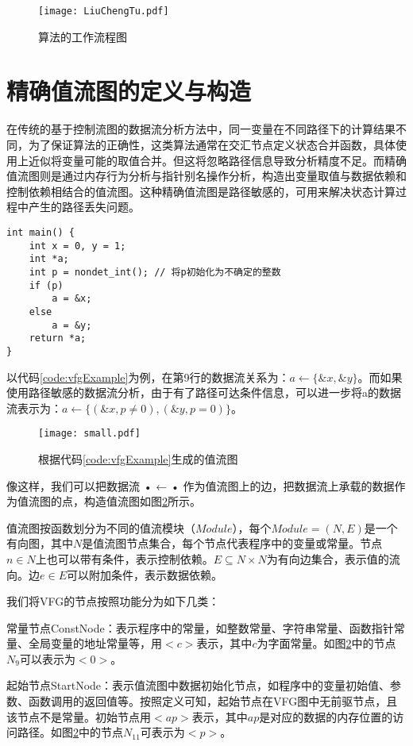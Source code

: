 \begin{figure}[H]
	\centering
	\texttt{[image: LiuChengTu.pdf]}
	\caption{算法的工作流程图}
	\label{fig:流程图}
\end{figure}

\section{精确值流图的定义与构造}

在传统的基于控制流图的数据流分析方法中，同一变量在不同路径下的计算结果不同，为了保证算法的正确性，这类算法通常在交汇节点定义状态合并函数，具体使用上近似将变量可能的取值合并。但这将忽略路径信息导致分析精度不足。而精确值流图则是通过内存行为分析与指针别名操作分析，构造出变量取值与数据依赖和控制依赖相结合的值流图。这种精确值流图是路径敏感的，可用来解决状态计算过程中产生的路径丢失问题。

\begin{lstlisting}[label=code:vfgExample,caption=代码样例]
int main() {
	int x = 0, y = 1;
	int *a;
	int p = nondet_int(); // 将p初始化为不确定的整数
	if (p)
		a = &x;
	else
		a = &y;
	return *a;
}
\end{lstlisting}

以代码\ref{code:vfgExample}为例，在第9行的数据流关系为：$ a \gets \{\&x, \&y\} $。而如果使用路径敏感的数据流分析，由于有了路径可达条件信息，可以进一步将a的数据流表示为：$ a \gets \{(\&x, p ≠ 0), (\&y, p = 0)\} $。

\begin{figure}[H]
	\centering
	\texttt{[image: small.pdf]}
	\caption{根据代码\ref{code:vfgExample}生成的值流图}
	\label{fig:small}
\end{figure}

像这样，我们可以把数据流 • ← • 作为值流图上的边，把数据流上承载的数据作为值流图的点，构造值流图如图\ref{fig:small}所示。

值流图按函数划分为不同的值流模块（$ Module $），每个$ Module = (N, E) $是一个有向图，其中$ N $是值流图节点集合，每个节点代表程序中的变量或常量。节点$ n ∈ N $上也可以带有条件，表示控制依赖。$ E ⊆ N × N $为有向边集合，表示值的流向。边$ e ∈ E $可以附加条件，表示数据依赖。

我们将VFG的节点按照功能分为如下几类：

常量节点ConstNode：表示程序中的常量，如整数常量、字符串常量、函数指针常量、全局变量的地址常量等，用$ <c> $表示，其中$ c $为字面常量。如图\ref{fig:small}中的节点$ N_{9} $可以表示为$ <0> $。

起始节点StartNode：表示值流图中数据初始化节点，如程序中的变量初始值、参数、函数调用的返回值等。按照定义可知，起始节点在VFG图中无前驱节点，且该节点不是常量。初始节点用$ <ap> $表示，其中$ ap $是对应的数据的内存位置的访问路径。如图\ref{fig:small}中的节点$ N_{11} $可表示为$ <p> $。

